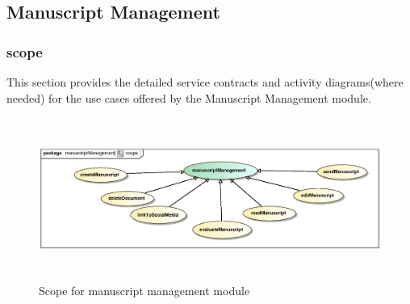 \subsection{Manuscript Management}

\subsubsection{scope}
\par{This section provides the detailed service contracts and activity diagrams(where needed) for the use cases offered by the Manuscript Management module.}

\begin{figure}[h]
	\includegraphics[height=200px, width=500px]{epsImages/ManuscriptManagement/scope.eps}
	\caption{Scope for manuscript management module}
\end{figure}

\newpage

